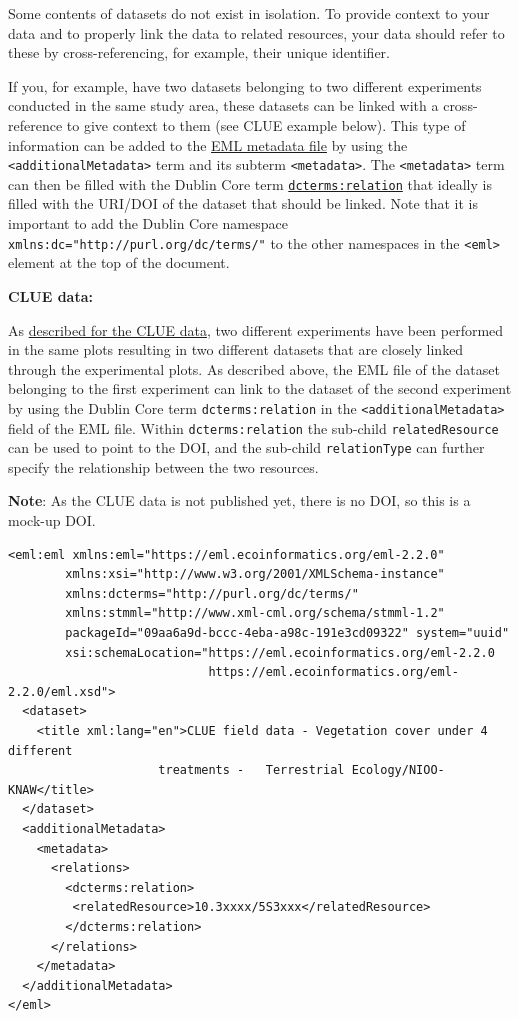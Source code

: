 \documentclass[
  oneside]{book}
\begin{document}
Some contents of datasets do not exist in isolation. To provide context to your data and to properly link the data to related resources, your data should refer to these by cross-referencing, for example, their unique identifier.

If you, for example, have two datasets belonging to two different experiments conducted in the same study area, these datasets can be linked with a cross-reference to give context to them (see CLUE example below). This type of information can be added to the \hyperref[eml-terms]{EML metadata file} by using the \texttt{\textless{}additionalMetadata\textgreater{}} term and its subterm \texttt{\textless{}metadata\textgreater{}}. The \texttt{\textless{}metadata\textgreater{}} term can then be filled with the Dublin Core term \href{http://purl.org/dc/terms/relation}{\texttt{dcterms:relation}} that ideally is filled with the URI/DOI of the dataset that should be linked. Note that it is important to add the Dublin Core namespace \texttt{xmlns:dc="http://purl.org/dc/terms/"} to the other namespaces in the \texttt{\textless{}eml\textgreater{}} element at the top of the document.

\begin{examplebox}

\textbf{CLUE data:}

As \hyperref[CLUE]{described for the CLUE data}, two different experiments have been performed in the same plots resulting in two different datasets that are closely linked through the experimental plots. As described above, the EML file of the dataset belonging to the first experiment can link to the dataset of the second experiment by using the Dublin Core term \texttt{dcterms:relation} in the \texttt{\textless{}additionalMetadata\textgreater{}} field of the EML file. Within \texttt{dcterms:relation} the sub-child \texttt{relatedResource} can be used to point to the DOI, and the sub-child \texttt{relationType} can further specify the relationship between the two resources.

\textbf{Note}: As the CLUE data is not published yet, there is no DOI, so this is a mock-up DOI.

\begin{verbatim}
<eml:eml xmlns:eml="https://eml.ecoinformatics.org/eml-2.2.0"
        xmlns:xsi="http://www.w3.org/2001/XMLSchema-instance"
        xmlns:dcterms="http://purl.org/dc/terms/"
        xmlns:stmml="http://www.xml-cml.org/schema/stmml-1.2"
        packageId="09aa6a9d-bccc-4eba-a98c-191e3cd09322" system="uuid"
        xsi:schemaLocation="https://eml.ecoinformatics.org/eml-2.2.0
                            https://eml.ecoinformatics.org/eml-2.2.0/eml.xsd">
  <dataset>
    <title xml:lang="en">CLUE field data - Vegetation cover under 4 different 
                     treatments -   Terrestrial Ecology/NIOO-KNAW</title>
  </dataset>
  <additionalMetadata>
    <metadata>
      <relations>
        <dcterms:relation>
         <relatedResource>10.3xxxx/5S3xxx</relatedResource>
        </dcterms:relation>
      </relations>
    </metadata>
  </additionalMetadata>
</eml>
\end{verbatim}

\end{examplebox}
\end{document}

